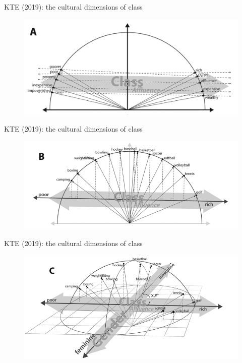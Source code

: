 \documentclass[usenames,dvipsnames,english]{beamer}
\begin{document}
\begin{frame}{KTE (2019): the cultural dimensions of class}
\begin{figure}
    \centering
    \includegraphics[scale = 0.4]{Images/kte_class_affluence.png}
    \end{figure}
\end{frame}
\begin{frame}{KTE (2019): the cultural dimensions of class}
\begin{figure}
    \centering
    \includegraphics[scale = 0.6]{Images/kte_class_sports.png}
    \end{figure}
\end{frame}
\begin{frame}{KTE (2019): the cultural dimensions of class}
\begin{figure}
    \centering
    \includegraphics[scale = 0.55]{Images/kte_class_gender_sports.png}
    \end{figure}
\end{frame}
\end{document}
